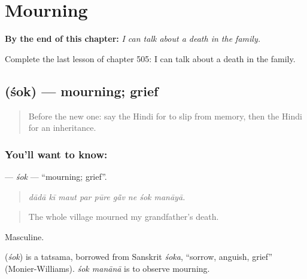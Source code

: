 
\chapter{Mourning}
\label{ch:hi-mourning}

\begin{chapteropening}
\textbf{By the end of this chapter:} \emph{I can talk about a death in the family.}

Complete the last lesson of chapter 505: I can talk about a death in the family.
\end{chapteropening}

\section[\texorpdfstring{\hi{शोक} (śok)}{शोक (śok)}]{ (śok) — mourning; grief}

\label{lesson:HI-C505-sok}



\begin{quote}
Before the new one: say the Hindi for to slip from memory, then the Hindi for an inheritance.
\end{quote}

\subsection*{You'll want to know: }
\textbf{} — \emph{śok} — \textquotedblleft{}mourning; grief\textquotedblright{}.

\begin{quote}
        
\end{quote}

\begin{quote}
\emph{dādā kī maut par pūre gā̃v ne śok manāyā.}
\end{quote}

\begin{quote}
The whole village mourned my grandfather's death.
\end{quote}

Masculine.

\begin{cousinweb}
\textbf{} (\emph{śok}) is a tatsama, borrowed from Sanskrit \emph{śoka}, \textquotedblleft{}sorrow, anguish, grief\textquotedblright{} (Monier-Williams). \emph{śok manānā} is to observe mourning.
\end{cousinweb}

